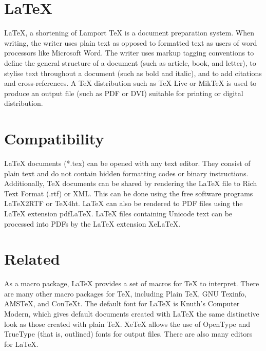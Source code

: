 \documentclass[onecolumn]{article}
\begin{document}
\section{LaTeX}
\LaTeX{}, a shortening of Lamport \TeX{} is a document preparation
system. When writing, the writer uses plain text as opposed to
formatted text as users of word processors like Microsoft Word. The
writer uses markup tagging conventions to define the general structure
of a document (such as article, book, and letter), to stylise text
throughout a document (such as bold and italic), and to add citations
and cross-references. A \TeX{} distribution such as \TeX{} Live or
MikTeX is used to produce an output file (such as PDF or DVI) suitable
for printing or digital distribution.

\section{Compatibility}
\LaTeX{} documents (*.tex) can be opened with any text editor. They
consist of plain text and do not contain hidden formatting codes or
binary instructions. Additionally, \TeX{} documents can be shared by
rendering the \LaTeX{} file to Rich Text Format (.rtf) or XML. This can
be done using the free software programs LaTeX2RTF or TeX4ht. \LaTeX{}
can also be rendered to PDF files using the \LaTeX{} extension pdfLaTeX.
\LaTeX{} files containing Unicode text can be processed into PDFs by the
\LaTeX{} extension XeLaTeX.

\section{Related}
As a macro package, \LaTeX{} provides a set of macros for \TeX{} to
interpret. There are many other macro packages for \TeX{}, including
Plain \TeX{}, GNU Texinfo, AMSTeX, and ConTeXt. The default font for
\LaTeX{} is Knuth's Computer Modern, which gives default documents
created with \LaTeX{} the same distinctive look as those created with
plain \TeX{}. XeTeX allows the use of OpenType and TrueType (that is,
outlined) fonts for output files. There are also many editors for
\LaTeX{}.
\end{document}
